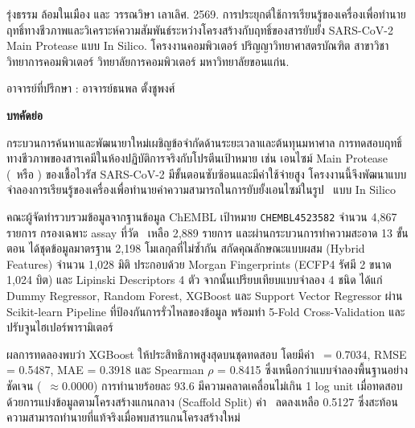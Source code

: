 \clearpage
{}
{}

\begin{flushleft}
\linespread{1.15}\selectfont
\noindent รุ่งธรรม ล้อมในเมือง และ วรรณวิษา เลาเลิศ. 2569. การประยุกต์ใช้การเรียนรู้ของเครื่องเพื่อทำนายฤทธิ์ทางชีวภาพและวิเคราะห์ความสัมพันธ์ระหว่างโครงสร้างกับฤทธิ์ของสารยับยั้ง SARS-CoV-2 Main Protease แบบ In Silico. โครงงานคอมพิวเตอร์ ปริญญาวิทยาศาสตรบัณฑิต สาขาวิชาวิทยาการคอมพิวเตอร์ วิทยาลัยการคอมพิวเตอร์ มหาวิทยาลัยขอนแก่น.\par
\vspace{0.3cm}
\noindent อาจารย์ที่ปรึกษา : อาจารย์ธนพล ตั้งชูพงศ์\par
\end{flushleft}

\vspace{0.6cm}
\begin{center}
{\large\bfseries บทคัดย่อ\par}
\end{center}
\vspace{0.3cm}

กระบวนการค้นหาและพัฒนายาใหม่เผชิญข้อจำกัดด้านระยะเวลาและต้นทุนมหาศาล การทดสอบฤทธิ์ทางชีวภาพของสารเคมีในห้องปฏิบัติการจริงกับโปรตีนเป้าหมาย เช่น เอนไซม์ Main Protease (\Mpro\ หรือ \CLpro) ของเชื้อไวรัส SARS-CoV-2 มีขั้นตอนซับซ้อนและมีค่าใช้จ่ายสูง โครงงานนี้จึงพัฒนาแบบจำลองการเรียนรู้ของเครื่องเพื่อทำนายค่าความสามารถในการยับยั้งเอนไซม์ในรูป \pICfifty\ แบบ In Silico

คณะผู้จัดทำรวบรวมข้อมูลจากฐานข้อมูล ChEMBL เป้าหมาย \texttt{CHEMBL4523582} จำนวน 4{,}867 รายการ กรองเฉพาะ assay ที่วัด \CLpro\ เหลือ 2{,}889 รายการ และผ่านกระบวนการทำความสะอาด 13 ขั้นตอน ได้ชุดข้อมูลมาตรฐาน 2{,}198 โมเลกุลที่ไม่ซ้ำกัน สกัดคุณลักษณะแบบผสม (Hybrid Features) จำนวน 1{,}028 มิติ ประกอบด้วย Morgan Fingerprints (ECFP4 รัศมี 2 ขนาด 1{,}024 บิต) และ Lipinski Descriptors 4 ตัว จากนั้นเปรียบเทียบแบบจำลอง 4 ชนิด ได้แก่ Dummy Regressor, Random Forest, XGBoost และ Support Vector Regressor ผ่าน Scikit-learn Pipeline ที่ป้องกันการรั่วไหลของข้อมูล พร้อมทำ 5-Fold Cross-Validation และปรับจูนไฮเปอร์พารามิเตอร์

ผลการทดลองพบว่า XGBoost ให้ประสิทธิภาพสูงสุดบนชุดทดสอบ โดยมีค่า \Rsq\ = 0.7034, RMSE = 0.5487, MAE = 0.3918 และ Spearman $\rho$ = 0.8415 ซึ่งเหนือกว่าแบบจำลองพื้นฐานอย่างชัดเจน (\Rsq\ $\approx 0.0000$) การทำนายร้อยละ 93.6 มีความคลาดเคลื่อนไม่เกิน 1 log unit เมื่อทดสอบด้วยการแบ่งข้อมูลตามโครงสร้างแกนกลาง (Scaffold Split) ค่า \Rsq\ ลดลงเหลือ 0.5127 ซึ่งสะท้อนความสามารถทำนายที่แท้จริงเมื่อพบสารแกนโครงสร้างใหม่

